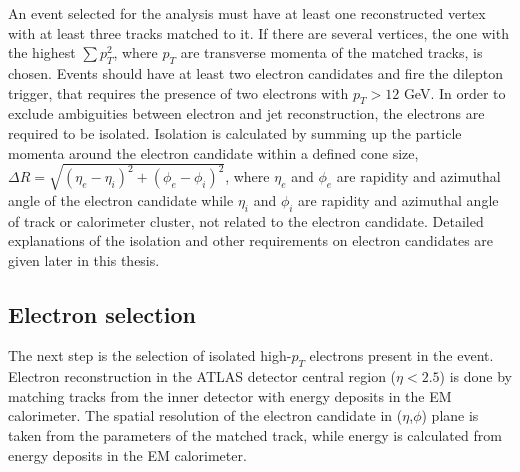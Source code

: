An event selected for the analysis must have at least one reconstructed vertex with at least three tracks matched to it. 
If there are several vertices, the one with the highest
$\sum p^2_T$, where $p_T$ are transverse momenta of the matched tracks, is chosen.
Events should have at least two electron candidates and fire the dilepton trigger, that requires the presence of two electrons with $p_T > 12$ GeV.
In order to exclude ambiguities between electron and jet reconstruction, the electrons are required to
be isolated. Isolation is calculated by summing up the particle momenta around the electron candidate within a defined cone size, 
$\Delta R = \sqrt{ (\eta_e-\eta_i)^2 + (\phi_e-\phi_i)^2 }$,
where $\eta_e$ and $\phi_e$ are rapidity and azimuthal angle of the electron candidate while $\eta_i$ and $\phi_i$ are rapidity and azimuthal angle of track or calorimeter cluster, not related to the electron candidate. Detailed explanations of the isolation and other requirements on electron candidates are given later in this thesis.

\subsection{Electron selection}
\label{subsec:electron_selection}
The next step is the selection of isolated high-$p_T$ electrons present in the event.
Electron reconstruction in the ATLAS detector central region ($\eta<2.5$) is done by matching tracks from the inner detector with energy deposits in the EM calorimeter.
The spatial resolution of the electron candidate in ($\eta$,$\phi$) plane is taken from the parameters of the matched track,
while energy is calculated from energy deposits in the EM calorimeter.



